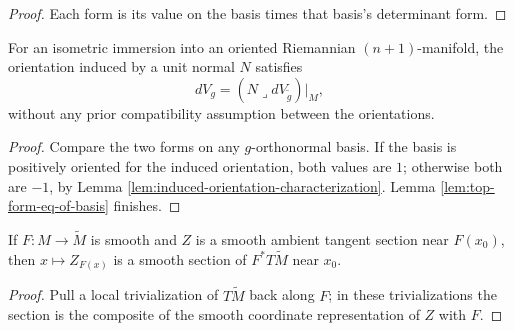 \begin{proof}

\sketch Each form is its value on the basis times that basis's determinant form.
\end{proof}

\begin{proposition}
\label{prop:hypersurface-volume-form-induced}





For an isometric immersion into an oriented Riemannian $(n+1)$-manifold, the orientation induced by a unit normal $N$ satisfies
\[
dV_g=(N\lrcorner dV_{\widetilde g})|_M,
\]
without any prior compatibility assumption between the orientations.
\end{proposition}

\begin{proof}

\sketch Compare the two forms on any $g$-orthonormal basis. If the basis is positively oriented for the induced orientation, both values are $1$; otherwise both are $-1$, by Lemma \ref{lem:induced-orientation-characterization}. Lemma \ref{lem:top-form-eq-of-basis} finishes.
\end{proof}

\begin{lemma}
\label{lem:pullback-comp-section}





If $F:M\to\widetilde M$ is smooth and $Z$ is a smooth ambient tangent section near $F(x_0)$, then $x\mapsto Z_{F(x)}$ is a smooth section of $F^*T\widetilde M$ near $x_0$.
\end{lemma}

\begin{proof}

\sketch Pull a local trivialization of $T\widetilde M$ back along $F$; in these trivializations the section is the composite of the smooth coordinate representation of $Z$ with $F$.
\end{proof}

